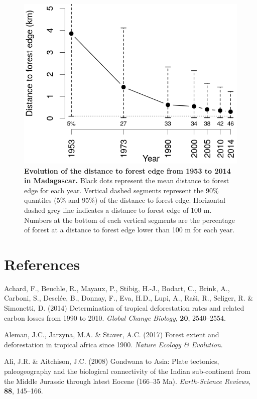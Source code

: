 \documentclass[]{article}
\theoremstyle{definition}
\theoremstyle{definition}
\theoremstyle{definition}
\theoremstyle{remark}
\begin{document}
\begin{figure}
\centering
\includegraphics{figs/dist.png}
\caption{\textbf{Evolution of the distance to forest edge from 1953 to
2014 in Madagascar.} Black dots represent the mean distance to forest
edge for each year. Vertical dashed segments represent the 90\%
quantiles (5\% and 95\%) of the distance to forest edge. Horizontal
dashed grey line indicates a distance to forest edge of 100 m. Numbers
at the bottom of each vertical segments are the percentage of forest at
a distance to forest edge lower than 100 m for each year.}
\end{figure}

\hypertarget{references}{%
\section*{References}\label{references}}

\hypertarget{refs}{}
\leavevmode\hypertarget{ref-Achard2014}{}%
Achard, F., Beuchle, R., Mayaux, P., Stibig, H.-J., Bodart, C., Brink,
A., Carboni, S., Desclée, B., Donnay, F., Eva, H.D., Lupi, A., Raši, R.,
Seliger, R. \& Simonetti, D. (2014) Determination of tropical
deforestation rates and related carbon losses from 1990 to 2010.
\emph{Global Change Biology}, \textbf{20}, 2540--2554.

\leavevmode\hypertarget{ref-Aleman2017}{}%
Aleman, J.C., Jarzyna, M.A. \& Staver, A.C. (2017) Forest extent and
deforestation in tropical africa since 1900. \emph{Nature Ecology \&
Evolution}.

\leavevmode\hypertarget{ref-Ali2008}{}%
Ali, J.R. \& Aitchison, J.C. (2008) Gondwana to Asia: Plate tectonics,
paleogeography and the biological connectivity of the Indian
sub-continent from the Middle Jurassic through latest Eocene (166--35
Ma). \emph{Earth-Science Reviews}, \textbf{88}, 145--166.
\end{document}
